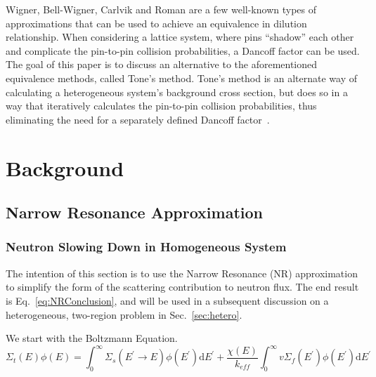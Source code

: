 \documentclass[10pt]{article}
\begin{document}
Wigner, Bell-Wigner, Carlvik and Roman are a few well-known types of approximations that can be used to achieve an equivalence in dilution relationship. When considering a lattice system, where pins ``shadow'' each other and complicate the pin-to-pin collision probabilities, a Dancoff factor can be used. The goal of this paper is to discuss an alternative to the aforementioned equivalence methods, called Tone's method. Tone's method is an alternate way of calculating a heterogeneous system's background cross section, but does so in a way that iteratively calculates the pin-to-pin collision probabilities, thus eliminating the need for a separately defined Dancoff factor~\cite{ch9}.



\section{Background}



\subsection{Narrow Resonance Approximation}\label{sec:nr}

\subsubsection{Neutron Slowing Down in Homogeneous System}
The intention of this section is to use the Narrow Resonance (NR) approximation to simplify the form of the scattering contribution to neutron flux. The end result is Eq.~\ref{eq:NRConclusion}, and will be used in a subsequent discussion on a heterogeneous, two-region problem in Sec.~\ref{sec:hetero}.\par

We start with the Boltzmann Equation.
\begin{equation}\Sigma_{t}(E)\phi(E)=\int_{0}^{\infty}\Sigma_{s}\left(E^{\prime}\rightarrow E\right)\phi\left(E^{\prime}\right)\mathrm{d}E^{\prime}+\frac{\chi(E)}{k_{eff}}\int_{0}^{\infty}v\Sigma_{f}\left(E^{\prime}\right)\phi\left(E^{\prime}\right)\mathrm{d}E^{\prime}\end{equation}
\end{document}
